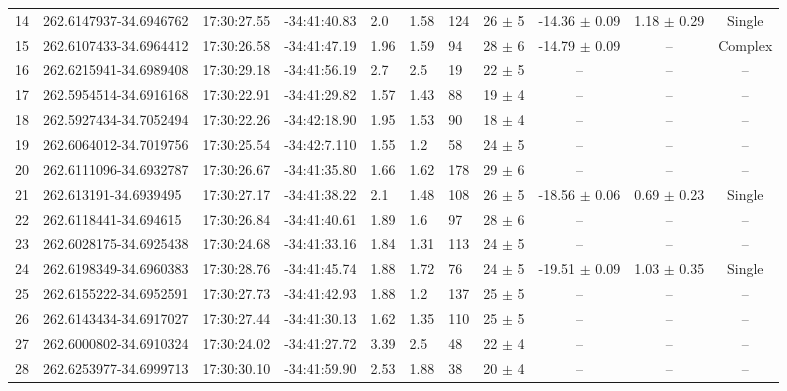 \begin{table}[htbp!]
\begin{tabular}{llllllllccc}
14  &  262.6147937-34.6946762  &  17:30:27.55  &  -34:41:40.83  &  2.0  &  1.58  &  124  &  26 $\pm$ 5  &  -14.36 $\pm$ 0.09  &  1.18 $\pm$ 0.29  &  Single \\
15  &  262.6107433-34.6964412  &  17:30:26.58  &  -34:41:47.19  &  1.96  &  1.59  &  94  &  28 $\pm$ 6  &  -14.79 $\pm$ 0.09  &  --  &  Complex \\
16  &  262.6215941-34.6989408  &  17:30:29.18  &  -34:41:56.19  &  2.7  &  2.5  &  19  &  22 $\pm$ 5  &  --  &  --  &  -- \\
17  &  262.5954514-34.6916168  &  17:30:22.91  &  -34:41:29.82  &  1.57  &  1.43  &  88  &  19 $\pm$ 4  &  --  &  --  &  -- \\
18  &  262.5927434-34.7052494  &  17:30:22.26  &  -34:42:18.90  &  1.95  &  1.53  &  90  &  18 $\pm$ 4  &  --  &  --  &  -- \\
19  &  262.6064012-34.7019756  &  17:30:25.54  &  -34:42:7.110  &  1.55  &  1.2  &  58  &  24 $\pm$ 5  &  --  &  --  &  -- \\
20  &  262.6111096-34.6932787  &  17:30:26.67  &  -34:41:35.80  &  1.66  &  1.62  &  178  &  29 $\pm$ 6  &  --  &  --  &  -- \\
21  &  262.613191-34.6939495  &  17:30:27.17  &  -34:41:38.22  &  2.1  &  1.48  &  108  &  26 $\pm$ 5  &  -18.56 $\pm$ 0.06  &  0.69 $\pm$ 0.23  &  Single \\
22  &  262.6118441-34.694615  &  17:30:26.84  &  -34:41:40.61  &  1.89  &  1.6  &  97  &  28 $\pm$ 6  &  --  &  --  &  -- \\
23  &  262.6028175-34.6925438  &  17:30:24.68  &  -34:41:33.16  &  1.84  &  1.31  &  113  &  24 $\pm$ 5  &  --  &  --  &  -- \\
24  &  262.6198349-34.6960383  &  17:30:28.76  &  -34:41:45.74  &  1.88  &  1.72  &  76  &  24 $\pm$ 5  &  -19.51 $\pm$ 0.09  &  1.03 $\pm$ 0.35  &  Single \\
25  &  262.6155222-34.6952591  &  17:30:27.73  &  -34:41:42.93  &  1.88  &  1.2  &  137  &  25 $\pm$ 5  &  --  &  --  &  -- \\
26  &  262.6143434-34.6917027  &  17:30:27.44  &  -34:41:30.13  &  1.62  &  1.35  &  110  &  25 $\pm$ 5  &  --  &  --  &  -- \\
27  &  262.6000802-34.6910324  &  17:30:24.02  &  -34:41:27.72  &  3.39  &  2.5  &  48  &  22 $\pm$ 4  &  --  &  --  &  -- \\
28  &  262.6253977-34.6999713  &  17:30:30.10  &  -34:41:59.90  &  2.53  &  1.88  &  38  &  20 $\pm$ 4  &  --  &  --  &  -- \\

\end{tabular}
\end{table}
